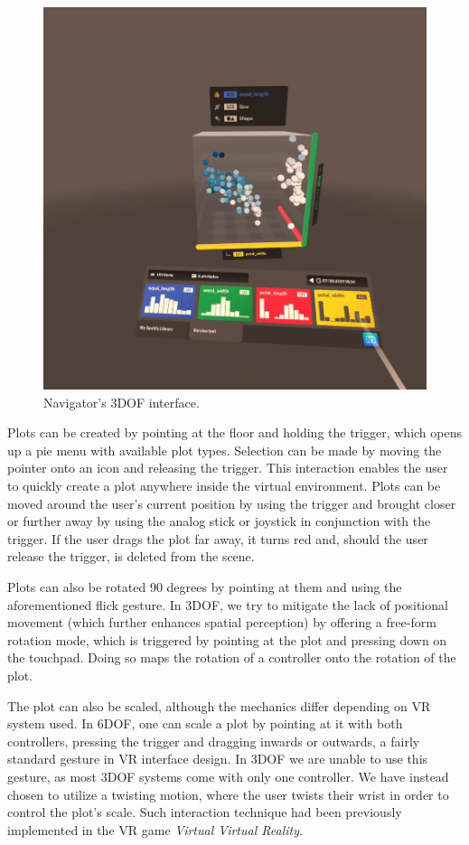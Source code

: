 \documentclass[thesis=M,english,hidelinks]{FITthesisXE}[2012/06/26]
\begin{document}
\begin{figure}[ht]
\centering
\includegraphics[scale=0.2]{cyberplot_3dof}
\caption{Navigator's 3DOF interface.}
\label{fig:cyberplot_3dof}
\end{figure}

Plots can be created by pointing at the floor and holding the trigger, which opens up a pie menu with available plot types. Selection can be made by moving the pointer onto an icon and releasing the trigger. This interaction enables the user to quickly create a plot anywhere inside the virtual environment. Plots can be moved around the user's current position by using the trigger and brought closer or further away by using the analog stick or joystick in conjunction with the trigger. If the user drags the plot far away, it turns red and, should the user release the trigger, is deleted from the scene.

Plots can also be rotated 90 degrees by pointing at them and using the aforementioned flick gesture. In 3DOF, we try to mitigate the lack of positional movement (which further enhances spatial perception) by offering a free-form rotation mode, which is triggered by pointing at the plot and pressing down on the touchpad. Doing so maps the rotation of a controller onto the rotation of the plot.

The plot can also be scaled, although the mechanics differ depending on VR system used. In 6DOF, one can scale a plot by pointing at it with both controllers, pressing the trigger and dragging inwards or outwards, a fairly standard gesture in VR interface design. In 3DOF we are unable to use this gesture, as most 3DOF systems come with only one controller. We have instead chosen to utilize a twisting motion, where the user twists their wrist in order to control the plot's scale. Such interaction technique had been previously implemented in the VR game \emph{Virtual Virtual Reality}.\autocite{vvr}
\end{document}
